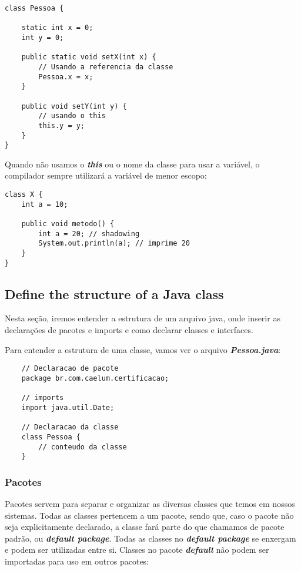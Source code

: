\documentclass[12pt]{article}
\begin{document}
\begin{lstlisting}
class Pessoa {
	
	static int x = 0;
	int y = 0;
	
	public static void setX(int x) {
		// Usando a referencia da classe
		Pessoa.x = x;
	}
	
	public void setY(int y) {
		// usando o this
		this.y = y;
	}
}
\end{lstlisting}

Quando não usamos o \textbf{\textit{this}} ou o nome da classe para usar a variável, o compilador sempre utilizará a variável de menor escopo:

\begin{lstlisting}
class X {
	int a = 10;
	
	public void metodo() {
		int a = 20; // shadowing
		System.out.println(a); // imprime 20
	}
}
\end{lstlisting}

\subsection{Define the structure of a Java class}

Nesta seção, iremos entender a estrutura de um arquivo java, onde inserir as declarações de pacotes e imports e como declarar classes e interfaces.

Para entender a estrutura de uma classe, vamos ver o arquivo \textbf{\textit{Pessoa.java}}:

\begin{lstlisting}
	// Declaracao de pacote
	package br.com.caelum.certificacao;
	
	// imports
	import java.util.Date;
	
	// Declaracao da classe
	class Pessoa {
		// conteudo da classe
	}
\end{lstlisting}

\subsubsection{Pacotes}

Pacotes servem para separar e organizar as diversas classes que temos em nossos sistemas. Todas as classes pertencem a um pacote, sendo que, caso o pacote não seja explicitamente declarado, a classe fará parte do que chamamos de pacote padrão, ou \textbf{\textit{default package}}. Todas as classes no \textbf{\textit{default package}} se enxergam e podem ser utilizadas entre si. Classes no pacote \textbf{\textit{default}} não podem ser importadas para uso em outros pacotes:
\end{document}
